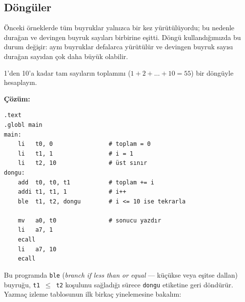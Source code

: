 \subsection{Döngüler}
\label{subsec:donguler}

Önceki örneklerde tüm buyruklar yalnızca bir kez yürütülüyordu; bu nedenle durağan ve devingen buyruk sayıları birbirine eşitti. Döngü kullandığımızda bu durum değişir: aynı buyruklar defalarca yürütülür ve devingen buyruk sayısı durağan sayıdan çok daha büyük olabilir.

\begin{ornek}[4.5]
\label{orn:dongu-toplam}
1'den 10'a kadar tam sayıların toplamını ($1 + 2 + \ldots + 10 = 55$) bir döngüyle hesaplayın.

\textbf{Çözüm:}

\begin{lstlisting}[style=riscv]
.text
.globl main
main:
    li   t0, 0                # toplam = 0
    li   t1, 1                # i = 1
    li   t2, 10               # üst sınır
dongu:
    add  t0, t0, t1           # toplam += i
    addi t1, t1, 1            # i++
    ble  t1, t2, dongu        # i <= 10 ise tekrarla

    mv   a0, t0               # sonucu yazdır
    li   a7, 1
    ecall
    li   a7, 10
    ecall
\end{lstlisting}

Bu programda \texttt{ble} (\emph{branch if less than or equal} --- küçükse veya eşitse dallan) buyruğu, \texttt{t1~$\leq$~t2} koşulunu sağladığı sürece \texttt{dongu} etiketine geri döndürür. Yazmaç izleme tablosunun ilk birkaç yinelemesine bakalım:


\end{ornek}
